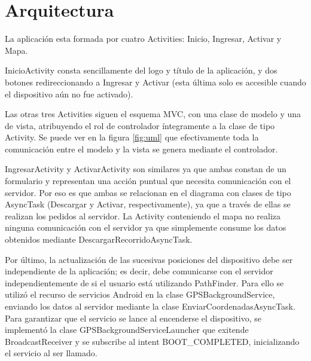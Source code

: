 \documentclass[a4paper]{article}
\begin{document}
\newpage
\section{Arquitectura}
\vspace*{2mm}
\vspace*{2mm}
\vspace*{2mm}
\vspace*{2mm}

La aplicación esta formada por cuatro Activities: Inicio, Ingresar, Activar y Mapa.
\vspace*{2mm}

InicioActivity consta sencillamente del logo y título de la aplicación, y dos botones redireccionando a Ingresar y Activar (esta última solo es accesible cuando el dispositivo aún no fue activado).
\vspace*{2mm}

Las otras tres Activities siguen el esquema MVC, con una clase de modelo y una de vista, atribuyendo el rol de controlador íntegramente a la clase de tipo Activity. Se puede ver en la figura \ref{fig:uml} que efectivamente toda la comunicación entre el modelo y la vista se genera mediante el controlador.
\vspace*{2mm}

IngresarActivity y ActivarActivity son similares ya que ambas constan de un formulario y representan una acción puntual que necesita comunicación con el servidor. Por eso es que ambas se relacionan en el diagrama con clases de tipo AsyncTask (Descargar y Activar, respectivamente), ya que a través de ellas se realizan los pedidos al servidor. La Activity conteniendo el mapa no realiza ninguna comunicación con el servidor ya que simplemente consume los datos obtenidos mediante DescargarRecorridoAsyncTask.
\vspace*{2mm}

Por último, la actualización de las sucesivas posiciones del dispositivo debe ser independiente de la aplicación; es decir, debe comunicarse con el servidor independientemente de si el usuario está utilizando PathFinder. Para ello se utilizó el recurso de servicios Android en la clase GPSBackgroundService, enviando los datos al servidor mediante la clase EnviarCoordenadasAsyncTask. Para garantizar que el servicio se lance al encenderse el dispositivo, se implementó la clase GPSBackgroundServiceLauncher que exitende BroadcastReceiver y se subscribe al intent BOOT\_COMPLETED, inicializando el servicio al ser llamado.
\end{document}
